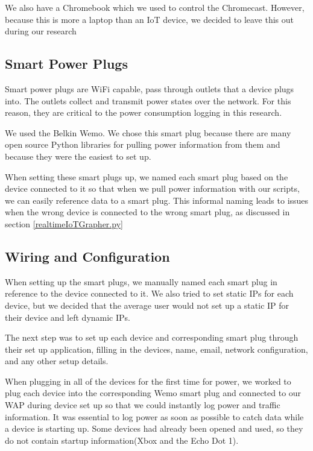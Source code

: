 We also have a Chromebook which we used to control the Chromecast. However, because this is more a laptop than an IoT device, we decided to leave this out during our research

\subsection{Smart Power Plugs}

Smart power plugs are WiFi capable, pass through outlets that a device plugs into. The outlets collect and transmit power states over the network. For this reason, they are critical to the power consumption logging in this research.

We used the Belkin Wemo. We chose this smart plug because there are many open source Python libraries for pulling power information from them and because they were the easiest to set up.

When setting these smart plugs up, we named each smart plug based on the device connected to it so that when we pull power information with our scripts, we can easily reference data to a smart plug. This informal naming leads to issues when the wrong device is connected to the wrong smart plug, as discussed in section \ref{realtimeIoTGrapher.py}

\subsection{Wiring and Configuration}

When setting up the smart plugs, we manually named each smart plug in reference to the device connected to it. We also tried to set static IPs for each device, but we decided that the average user would not set up a static IP for their device and left dynamic IPs.

The next step was to set up each device and corresponding smart plug through their set up application, filling in the devices, name, email, network configuration, and any other setup details.

When plugging in all of the devices for the first time for power, we worked to plug each device into the corresponding Wemo smart plug and connected to our WAP during device set up so that we could instantly log power and traffic information. It was essential to log power as soon as possible to catch data while a device is starting up. Some devices had already been opened and used, so they do not contain startup information(Xbox and the Echo Dot 1).

